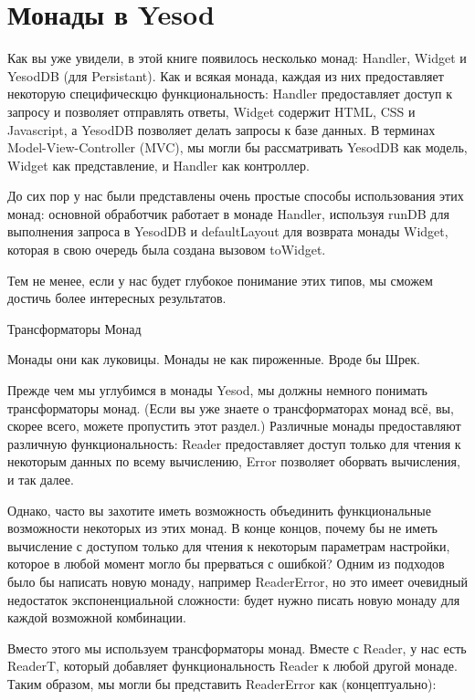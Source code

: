 \chapter{Монады в Yesod}\label{chap:yesod_monads}

Как вы уже увидели, в этой книге появилось несколько монад: Handler, Widget и YesodDB (для Persistant). Как и всякая монада, каждая из них предоставляет некоторую специфическцю функциональность: Handler предоставляет доступ к запросу и позволяет отправлять ответы, Widget содержит HTML, CSS и Javascript, а YesodDB позволяет делать запросы к базе данных. В терминах Model-View-Controller (MVC), мы могли бы рассматривать YesodDB как модель, Widget как представление, и Handler как контроллер.

До сих пор у нас были представлены очень простые способы использования этих монад: основной обработчик работает в монаде Handler, используя runDB для выполнения запроса в YesodDB и defaultLayout для возврата монады Widget, которая в свою очередь была создана вызовом toWidget.

Тем не менее, если у нас будет глубокое понимание этих типов, мы сможем достичь более интересных результатов.

Трансформаторы Монад

Монады они как луковицы. Монады не как пироженные. Вроде бы Шрек.

Прежде чем мы углубимся в монады Yesod, мы должны немного понимать трансформаторы монад. (Если вы уже знаете о трансформаторах монад всё, вы, скорее всего, можете пропустить этот раздел.) Различные монады предоставляют различную функциональность: Reader предоставляет доступ только для чтения к некоторым данных по всему вычислению, Error позволяет оборвать вычисления, и так далее.

Однако, часто вы захотите иметь возможность объединить функциональные возможности некоторых из этих монад. В конце концов, почему бы не иметь вычисление с доступом только для чтения к некоторым параметрам настройки, которое в любой момент могло бы прерваться с ошибкой? Одним из подходов было бы написать новую монаду, например ReaderError, но это имеет очевидный недостаток экспоненциальной сложности: будет нужно писать новую монаду для каждой возможной комбинации.

Вместо этого мы используем трансформаторы монад. Вместе с Reader, у нас есть ReaderT, который добавляет функциональность Reader к любой другой монаде. Таким образом, мы могли бы представить ReaderError как (концептуально):

